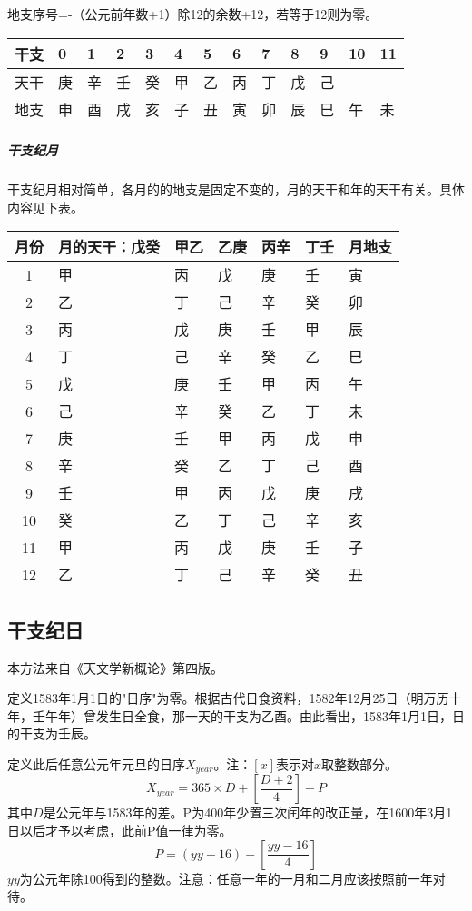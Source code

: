 地支序号=-（公元前年数+1）除12的余数+12，若等于12则为零。
\begin{center}
	\begin{tabularx}{\textwidth}{|c|X|X|X|X|X|X|X|X|X|X|X|X|}
		\hline
		干支&0&1&2&3&4&5&6&7&8&9&10&11\\
		\hline
		天干&庚&辛&壬&癸&甲&乙&丙&丁&戊&己&&\\
		\hline
		地支&申&酉&戌&亥&子&丑&寅&卯&辰&巳&午&未\\
		\hline
	\end{tabularx}	
\end{center}
\subparagraph{干支纪月}
干支纪月相对简单，各月的的地支是固定不变的，月的天干和年的天干有关。具体内容见下表。
\begin{center}
	\begin{tabularx}{\textwidth}{|c|X|X|X|X|X|X|}
		\hline
		月份&月的天干：戊癸&甲乙&乙庚&丙辛&丁壬&月地支\\
		\hline
		1&甲&丙&戊&庚&壬&寅\\
		\hline
		2&乙&丁&己&辛&癸&卯\\
		\hline
		3&丙&戊&庚&壬&甲&辰\\
		\hline
		4&丁&己&辛&癸&乙&巳\\
		\hline
		5&戊&庚&壬&甲&丙&午\\
		\hline
		6&己&辛&癸&乙&丁&未\\
		\hline
		7&庚&壬&甲&丙&戊&申\\
		\hline
		8&辛&癸&乙&丁&己&酉\\
		\hline
		9&壬&甲&丙&戊&庚&戌\\
		\hline
		10&癸&乙&丁&己&辛&亥\\
		\hline
		11&甲&丙&戊&庚&壬&子\\
		\hline
		12&乙&丁&己&辛&癸&丑\\
		\hline
	\end{tabularx}
\end{center}
\subsection{干支纪日}
本方法来自《天文学新概论》第四版。

定义1583年1月1日的"日序"为零。根据古代日食资料，1582年12月25日（明万历十年，壬午年）曾发生日全食，那一天的干支为乙酉。由此看出，1583年1月1日，日的干支为壬辰。

定义此后任意公元年元旦的日序$X_{year}$。注：$\left[x\right]$表示对$x$取整数部分。
\begin{equation}
	X_{year}=365\times D+\left[\frac{D+2}{4}\right]-P
\end{equation}
其中$D$是公元年与1583年的差。P为400年少置三次闰年的改正量，在1600年3月1日以后才予以考虑，此前P值一律为零。
\begin{equation}
	P=(yy-16)-\left[\frac{yy-16}{4}\right]
\end{equation}
$yy$为公元年除100得到的整数。注意：任意一年的一月和二月应该按照前一年对待。


